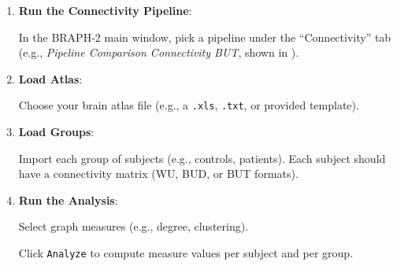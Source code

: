 \documentclass[justified]{tufte-handout}
\begin{document}
\begin{enumerate}

\item \textbf{Run the Connectivity Pipeline}:

In the BRAPH-2 main window, pick a pipeline under the ``Connectivity'' tab (e.g., \textit{Pipeline Comparison Connectivity BUT}, shown in ).

\item \textbf{Load Atlas}:

Choose your brain atlas file (e.g., a \texttt{.xls}, \texttt{.txt}, or provided template).


\item \textbf{Load Groups}:

Import each group of subjects (e.g., controls, patients). Each subject should have a connectivity matrix (WU, BUD, or BUT formats).


\item \textbf{Run the Analysis}:

Select graph measures (e.g., degree, clustering).

Click \texttt{Analyze} to compute measure values per subject and per group.


\end{enumerate}
\end{document}
